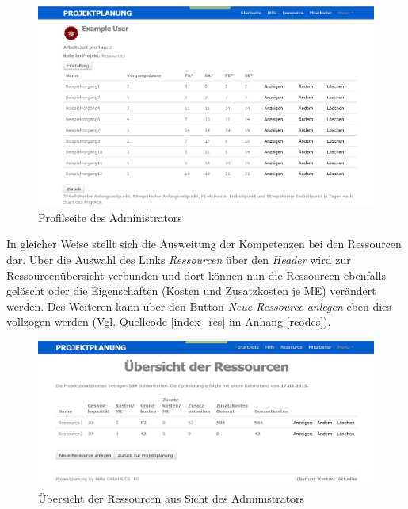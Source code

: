 \documentclass[a4paper,12pt,parskip,bibtotoc,liststotoc]{article}
\begin{document}
\begin{figure}[h!]
  \begin{center}
    \includegraphics[width=120mm]{Bilder/Profilseite_Admin.png}
    \caption{Profilseite des Administrators}  \label{ProAd}
  \end{center}
\end{figure}       

In gleicher Weise stellt sich die Ausweitung der Kompetenzen bei den Ressourcen dar. Über die Auswahl des Links \textit{Ressourcen} über den \textit{Header} wird zur Ressourcenübersicht verbunden und dort können nun die Ressourcen ebenfalls gelöscht oder die Eigenschaften (Kosten und Zusatzkosten je ME) verändert werden. Des Weiteren kann über den Button \textit{Neue Ressource anlegen} eben dies vollzogen werden (Vgl. Quellcode \ref{index_res} im Anhang \ref{rcodes}).\\      

\begin{figure}[h!]
  \begin{center}
    \includegraphics[width=120mm]{Bilder/Ressourcen_Admin.png}
    \caption{Übersicht der Ressourcen aus Sicht des Administrators}  \label{ResAd}
  \end{center}
\end{figure}     
  
\end{document}
